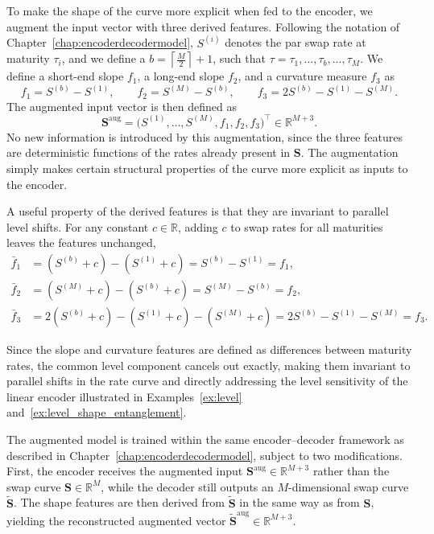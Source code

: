 To make the shape of the curve more explicit when fed to the encoder, we augment the input vector with three derived features. Following the notation of Chapter~\ref{chap:encoderdecodermodel}, $S^{(i)}$ denotes the par swap rate at maturity $\tau_i$, and we define a \(b= \left\lceil \frac{M}{2}\right\rceil +1\), such that \(\tau = \tau_1, \dotsc, \tau_b, \dots, \tau_M\). We define a short-end slope $f_1$, a long-end slope $f_2$, and a 
curvature measure $f_3$ as
\[
f_1 = S^{(b)} - S^{(1)}, \qquad f_2 = S^{(M)} - S^{(b)}, \qquad 
f_3 = 2S^{(b)} - S^{(1)} - S^{(M)}.
\]
The augmented input vector is then defined as
\[
\mathbf{S}^{\text{aug}} = \bigl(S^{(1)}, \ldots, S^{(M)}, f_1, f_2, f_3\bigr)^\top 
\in \mathbb{R}^{M+3}.
\]
No new information is introduced by this augmentation, since the three features are deterministic functions of the rates already present in $\mathbf{S}$. The augmentation simply makes certain structural properties of the curve more explicit as inputs to the encoder.

A useful property of the derived features is that they are invariant to parallel level shifts. For any constant $c \in \mathbb{R}$, adding $c$ to swap rates for all maturities leaves the features unchanged,
\begin{align*}
\bar{f}_1 &= (S^{(b)} + c) - (S^{(1)} + c) = S^{(b)} - S^{(1)} = f_1, \\
\bar{f}_2 &= (S^{(M)} + c) - (S^{(b)} + c) = S^{(M)} - S^{(b)} = f_2, \\
\bar{f}_3 &= 2(S^{(b)} + c) - (S^{(1)} + c) - (S^{(M)} + c) = 2S^{(b)} - S^{(1)} - S^{(M)} = f_3.
\end{align*}

Since the slope and curvature features are defined as differences between maturity rates, the common level component cancels out exactly, making them invariant to parallel shifts in the rate curve and directly addressing the level sensitivity of the linear encoder illustrated in Examples~\ref{ex:level} and~\ref{ex:level_shape_entanglement}.

The augmented model is trained within the same encoder--decoder framework 
as described in Chapter~\ref{chap:encoderdecodermodel}, subject to two modifications. First, the encoder receives the augmented input $\mathbf{S}^{\text{aug}} \in \mathbb{R}^{M+3}$ 
rather than the swap curve $\mathbf{S} \in \mathbb{R}^{M}$, while the decoder still outputs an $M$-dimensional swap curve $\widetilde{\mathbf{S}}$. The shape features are then derived from $\widetilde{\mathbf{S}}$ in the same way as from $\mathbf{S}$, yielding the reconstructed augmented vector $\widetilde{\mathbf{S}}^{\text{aug}} \in \mathbb{R}^{M+3}$.

